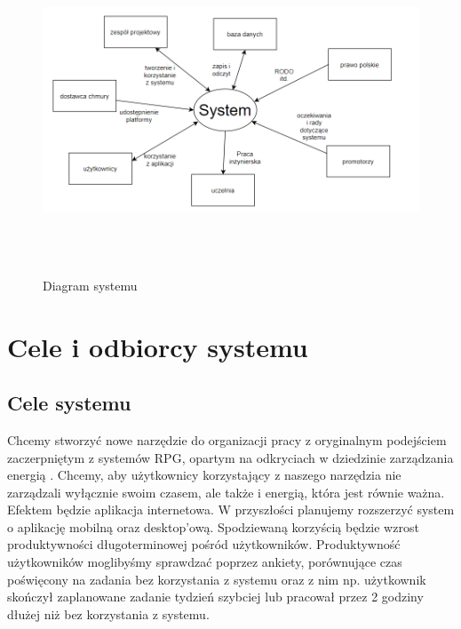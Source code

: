\documentclass[a4paper,11pt]{report}
\begin{document}
\begin{figure}[h]
	\centering
	\includegraphics[width=\textwidth, height=9cm]{system}\\
	\caption{Diagram systemu}
	\label{fig:system}
\end{figure}
\section {Cele i odbiorcy systemu}
\subsection {Cele systemu}
Chcemy stworzyć nowe narzędzie do organizacji pracy z oryginalnym podejściem zaczerpniętym z systemów RPG,
 opartym na odkryciach w dziedzinie zarządzania energią \cite{Harward}.
 Chcemy, aby użytkownicy korzystający z naszego narzędzia nie zarządzali wyłącznie swoim czasem,
 ale także i energią, która jest równie ważna. Efektem będzie aplikacja internetowa.
 W przyszłości planujemy rozszerzyć system o aplikację mobilną oraz desktop'ową.
 Spodziewaną korzyścią będzie wzrost produktywności długoterminowej pośród użytkowników.
 Produktywność użytkowników moglibyśmy sprawdzać poprzez ankiety,
 porównujące czas poświęcony na zadania bez korzystania z systemu oraz z nim np. użytkownik skończył
 zaplanowane zadanie tydzień szybciej lub pracował przez 2 godziny dłużej niż bez korzystania z systemu.\\
\end{document}
